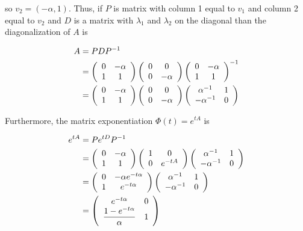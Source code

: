 \documentclass{article}
\numberwithin{questioncounter}{section}
\begin{document}
\begin{solution}
so $v_{2} = (-\alpha, 1)$. Thus, if $P$ is matrix with column 1 equal to $v_{1}$ and column 2 equal to $v_{2}$ and $D$ is a matrix with $\lambda_{1}$ and $\lambda_{2}$ on the diagonal than the diagonalization of $A$ is

\begin{align*}
A &= PDP^{-1} \\
&= \left( \begin{array}{c c} 0 & -\alpha \\ 1 & 1 \end{array} \right) \left(\begin{array}{c c} 0 & 0 \\ 0 & -\alpha \end{array} \right) \left(\begin{array}{c c} 0 & -\alpha \\ 1 & 1 \end{array} \right)^{-1} \\
&= \left( \begin{array}{c c} 0 & -\alpha \\ 1 & 1 \end{array} \right) \left( \begin{array}{c c} 0 & 0 \\ 0 & -\alpha \end{array} \right) \left( \begin{array}{c c} \alpha^{-1} & 1 \\ -\alpha^{-1} & 0 \end{array} \right)
\end{align*}

Furthermore, the matrix exponentiation $\Phi(t) = e^{tA}$ is

\begin{align*}
e^{t A} &= P e^{tD} P^{-1} \\
&= \left( \begin{array}{c c} 0 & -\alpha \\ 1 & 1 \end{array} \right) \left( \begin{array}{c c} 1 & 0 \\ 0 & e^{-tA} \end{array} \right) \left( \begin{array}{c c} \alpha^{-1} & 1 \\ -\alpha^{-1} & 0 \end{array} \right) \\
&= \left(\begin{array}{c c} 0 & -\alpha e^{-t\alpha} \\ 1 & e^{-t\alpha}\end{array} \right) \left( \begin{array}{c c} \alpha^{-1} & 1 \\ - \alpha^{-1} & 0 \end{array} \right) \\
&= \left(\begin{array}{c c} e^{-t\alpha} & 0 \\ \dfrac{1 - e^{-t\alpha}}{\alpha} & 1 \end{array} \right)
\end{align*}


\end{solution}
\end{document}
